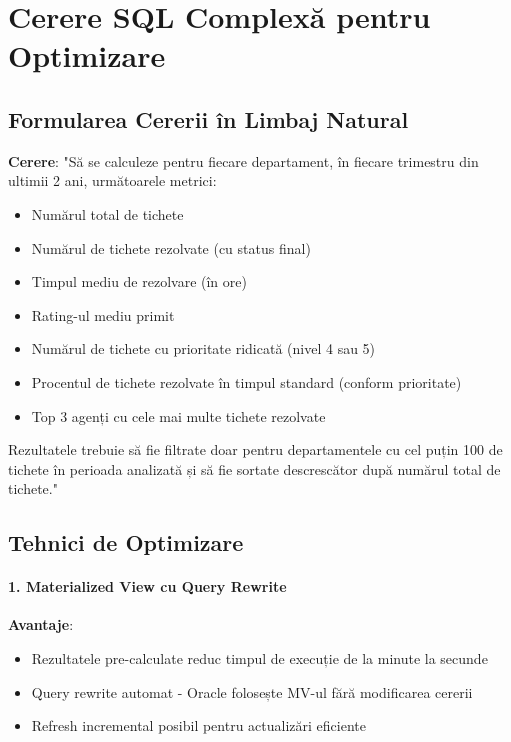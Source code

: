 \chapter{Cerere SQL Complexă pentru Optimizare}
\label{sec:cerere_optimizare}

\section{Formularea Cererii în Limbaj Natural}

\textbf{Cerere}: "Să se calculeze pentru fiecare departament, în fiecare trimestru din ultimii 2 ani, următoarele metrici:
\begin{itemize}
    \item Numărul total de tichete
    \item Numărul de tichete rezolvate (cu status final)
    \item Timpul mediu de rezolvare (în ore)
    \item Rating-ul mediu primit
    \item Numărul de tichete cu prioritate ridicată (nivel 4 sau 5)
    \item Procentul de tichete rezolvate în timpul standard (conform prioritate)
    \item Top 3 agenți cu cele mai multe tichete rezolvate
\end{itemize}

Rezultatele trebuie să fie filtrate doar pentru departamentele cu cel puțin 100 de tichete în perioada analizată și să fie sortate descrescător după numărul total de tichete."

\section{Tehnici de Optimizare}

\subsubsection{1. Materialized View cu Query Rewrite}

\textbf{Avantaje}:
\begin{itemize}
    \item Rezultatele pre-calculate reduc timpul de execuție de la minute la secunde
    \item Query rewrite automat - Oracle folosește MV-ul fără modificarea cererii
    \item Refresh incremental posibil pentru actualizări eficiente
\end{itemize}

